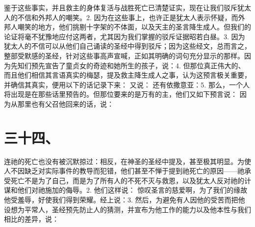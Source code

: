 鉴于这些事实，并且救主的身体复活与战胜死亡已清楚证实，现在让我们驳斥犹太人的不信和外邦人的嘲笑。\newline{}2. 因为在这些事上，也许正是犹太人表示怀疑，而外邦人嘲笑的地方，他们挑剔十字架的不体面，以及天主的圣言降生成人。但我们的论证将毫不犹豫地应付这两者，尤其因为我们掌握的驳斥证据昭若白昼。\newline{}3. 因为犹太人的不信可以从他们自己诵读的圣经中得到驳斥；因为这些经文，总而言之，整部受默感的圣经，针对这些事高声宣喊，正如其明确的词句充分显示的那样。因为先知们预先宣告了童贞女的奇迹和她所生的孩子，说：\newline{}4. 但那位真正伟大的、而且他们相信其言语真实的梅瑟，提及救主降生成人之事，认为这预言极关重要，并确信其真实，便用以下的话记录下来： 又说： 还有依撒意亚：\newline{}5. 那么，一个人将出现是在那些话里预告的。但那位要来的是万有的主，他们又如下预言说： 因为从那里也有父召他回来的话，说：\par


\section{三十四、}

连祂的死亡也没有被沉默掠过：相反，在神圣的圣经中提及，甚至极其明显。为使人不因缺乏对实际事件的教导而犯错，他们甚至不惮于提到祂死亡的原因——祂承受死亡不是为了自己，而是为了所有人的不死不灭与救恩，以及犹太人反对祂的计谋和他们对祂施加的侮辱。\newline{}2. 他们这样说： 惊叹圣言的慈爱啊，为了我们的缘故他受羞辱，好使我们得到荣耀。经上说：\newline{}3. 然后，为避免有人因他的受苦而把他设想为平常人，圣经预先防止人的猜测，并宣布为他工作的能力以及他本性与我们相比的差异，说：\par

